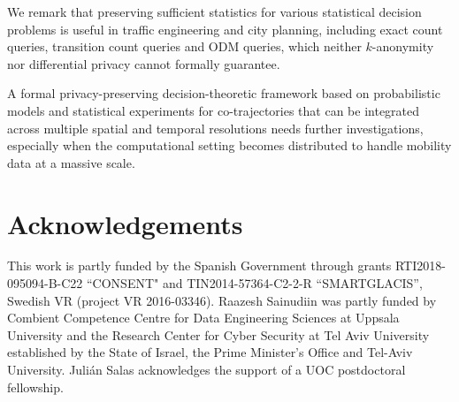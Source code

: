 \documentclass[times,twocolumn,final,authoryear]{elsarticle}
\begin{document}
We remark that preserving sufficient statistics for various statistical decision problems is useful in traffic engineering and city planning, including exact count queries, transition count queries and ODM queries, which neither $k$-anonymity nor differential privacy cannot formally guarantee.


A formal privacy-preserving decision-theoretic framework based on probabilistic models and statistical experiments for co-trajectories that can be integrated across multiple spatial and temporal resolutions needs further investigations, especially when the computational setting becomes distributed to handle mobility data at a massive scale.

\section*{Acknowledgements}
This work is partly funded by the Spanish Government through grants  RTI2018-095094-B-C22 ``CONSENT" and TIN2014-57364-C2-2-R ``SMARTGLACIS'', Swedish VR (project VR 2016-03346). Raazesh Sainudiin was partly funded by Combient Competence Centre for Data Engineering Sciences at Uppsala University and the Research Center for Cyber Security at Tel Aviv University established by the State of Israel, the Prime Minister's Office and Tel-Aviv University. 
Juli\'{a}n Salas acknowledges the support of a UOC postdoctoral fellowship.






\end{document}

